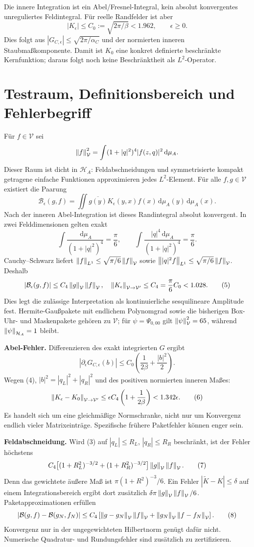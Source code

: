 \documentclass[10pt,a4paper]{article}
\newcommand{\HH}{\mathcal H_A}\newcommand{\VV}{\mathcal V}
\newcommand{\dd}{\,\mathrm d}\newcommand{\ii}{\mathrm i}
\begin{document}
Die innere Integration ist ein Abel/Fresnel-Integral, kein absolut konvergentes
unreguliertes Feldintegral. Für reelle Randfelder ist aber
\[
 |K_\epsilon|\le C_0:=\sqrt{2\pi/\beta}<1.962,
 \qquad \epsilon\ge0. \tag{2}
\]
Dies folgt aus $|G_{C,\epsilon}|\le\sqrt{2\pi/\alpha_C}$ und der normierten
inneren Staubmaßkomponente. Damit ist $K_0$ eine konkret definierte beschränkte
Kernfunktion; daraus folgt noch keine Beschränktheit als $L^2$-Operator.
\newpage

\section{Testraum, Definitionsbereich und Fehlerbegriff}
Für $f\in\VV$ sei
\[
 \norm f_\VV^2=\int(1+|q|^2)^4|f(z,q)|^2\dd\mu_A.
\]
Dieser Raum ist dicht in $\HH$: Feldabschneidungen und symmetrisierte kompakt
getragene einfache Funktionen approximieren jedes $L^2$-Element. Für alle
$f,g\in\VV$ existiert die Paarung
\[
 \mathcal B_\epsilon(g,f)=\iint\overline{g(y)}K_\epsilon(y,x)f(x)
 \dd\mu_A(y)\dd\mu_A(x).
 \tag{3}
\]
Nach der inneren Abel-Integration ist dieses Randintegral absolut konvergent.
In zwei Felddimensionen gelten exakt
\[
 \int\frac{\dd\mu_A}{(1+|q|^2)^4}=\frac\pi6,
 \qquad
 \int\frac{|q|^4\dd\mu_A}{(1+|q|^2)^4}=\frac\pi6.
 \tag{4}
\]
Cauchy--Schwarz liefert $\norm f_{L^1}\le\sqrt{\pi/6}\norm f_\VV$ sowie
$\norm{|q|^2f}_{L^1}\le\sqrt{\pi/6}\norm f_\VV$. Deshalb
\[
 |\mathcal B_\epsilon(g,f)|\le C_4\norm g_\VV\norm f_\VV,
 \quad \norm{K_\epsilon}_{\VV\to\VV'}\le C_4=\frac\pi6C_0<1.028.
 \tag{5}
\]
Dies legt die zulässige Interpretation als kontinuierliche sesquilineare
Amplitude fest. Hermite-Gaußpakete mit endlichem Polynomgrad sowie die bisherigen
Box-Uhr- und Maskenpakete gehören zu $\VV$; für $\psi=\Psi_{0,00}$ gilt
$\norm\psi_\VV^2=65$, während $\norm\psi_{\HH}=1$ bleibt.

\textbf{Abel-Fehler.} Differenzieren des exakt integrierten $G$ ergibt
\[
 |\partial_\epsilon G_{C,\epsilon}(b)|
 \le C_0\left(\frac1{2\beta}+\frac{|b|^2}{2}\right).
\]
Wegen (4), $|b|^2=|q_L|^2+|q_R|^2$ und des positiven normierten inneren Maßes:
\[
 \norm{K_\epsilon-K_0}_{\VV\to\VV'}
 \le \epsilon C_4\left(1+\frac1{2\beta}\right)
 <1.342\epsilon. \tag{6}
\]
Es handelt sich um eine gleichmäßige Normschranke, nicht nur um Konvergenz
endlich vieler Matrixeinträge. Spezifische frühere Paketfehler können enger sein.

\textbf{Feldabschneidung.} Wird (3) auf $|q_L|\le R_L$, $|q_R|\le R_R$
beschränkt, ist der Fehler höchstens
\[
 C_4\big[(1+R_L^2)^{-3/2}+(1+R_R^2)^{-3/2}\big]
 \norm g_\VV\norm f_\VV. \tag{7}
\]
Denn das gewichtete äußere Maß ist $\pi(1+R^2)^{-3}/6$.
Ein Fehler $|\widetilde K-K|\le\delta$ auf einem Integrationsbereich ergibt
dort zusätzlich $\delta\pi\norm g_\VV\norm f_\VV/6$.
Paketapproximationen erfüllen
\[
 |\mathcal B(g,f)-\mathcal B(g_N,f_N)|\le C_4\left[
 \norm{g-g_N}_\VV\norm f_\VV+
 \norm{g_N}_\VV\norm{f-f_N}_\VV\right]. \tag{8}
\]
Konvergenz nur in der ungegewichteten Hilbertnorm genügt dafür nicht.
Numerische Quadratur- und Rundungsfehler sind zusätzlich zu zertifizieren.
\newpage
\end{document}
